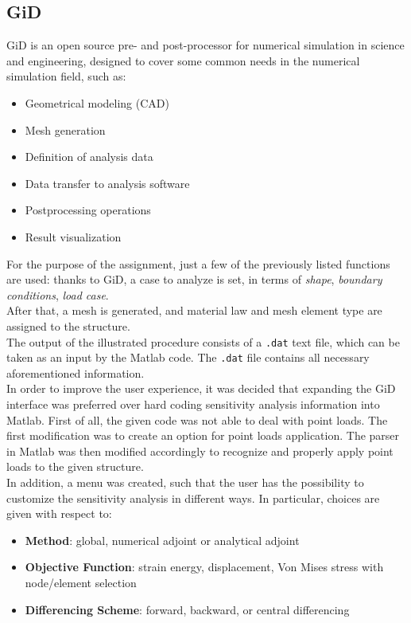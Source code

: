 \subsection{GiD}
GiD is an open source pre- and post-processor for numerical simulation in science and engineering, designed to cover some common needs in the numerical simulation field, such as: 
\begin{itemize}
\item Geometrical modeling (CAD) 
\item Mesh generation
\item Definition of analysis data
\item Data transfer to analysis software
\item Postprocessing operations
\item Result visualization
\end{itemize}
For the purpose of the assignment, just a few of the previously listed functions are used: thanks to GiD, a case to analyze is set, in terms of \textit{shape}, \textit{boundary conditions}, \textit{load case}. \\[3pt]
After that, a mesh is generated, and material law and mesh element type are assigned to the structure. \\[3pt]
The output of the illustrated procedure consists of a \texttt{.dat} text file, which can be taken as an input by the Matlab code. The \texttt{.dat} file contains all necessary aforementioned information.\\[3pt]
In order to improve the user experience, it was decided that expanding the GiD interface was preferred over hard coding sensitivity analysis information into Matlab. First of all, the given code was not able to deal with point loads. The first modification was to create an option for point loads application. The parser in Matlab was then modified accordingly to recognize and properly apply point loads to the given structure.\\[3pt]
In addition, a menu was created, such that the user has the possibility to customize the sensitivity analysis in different ways. In particular, choices are given with respect to: 
\begin {itemize}
\item \textbf{Method}: global, numerical adjoint or analytical adjoint
\item \textbf{Objective Function}: strain energy, displacement, Von Mises stress with node/element selection
\item \textbf{Differencing Scheme}: forward, backward, or central differencing
\end{itemize}
